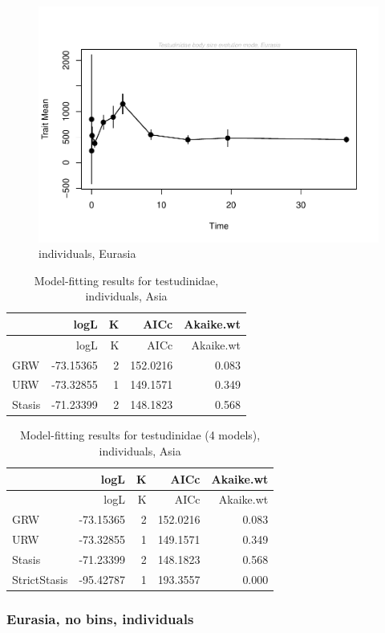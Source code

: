 \documentclass[]{article}
\begin{document}
\begin{figure}[htbp]
\centering
\includegraphics{MA_JJ_files/figure-latex/paleoTS, individuals, Eurasia-1.pdf}
\caption{individuals, Eurasia}
\end{figure}

\begin{longtable}[]{@{}lrrrr@{}}
\caption{Model-fitting results for testudinidae, individuals,
Asia}\tabularnewline
\toprule
& logL & K & AICc & Akaike.wt\tabularnewline
\midrule
\endfirsthead
\toprule
& logL & K & AICc & Akaike.wt\tabularnewline
\midrule
\endhead
GRW & -73.15365 & 2 & 152.0216 & 0.083\tabularnewline
URW & -73.32855 & 1 & 149.1571 & 0.349\tabularnewline
Stasis & -71.23399 & 2 & 148.1823 & 0.568\tabularnewline
\bottomrule
\end{longtable}

\begin{longtable}[]{@{}lrrrr@{}}
\caption{Model-fitting results for testudinidae (4 models), individuals,
Asia}\tabularnewline
\toprule
& logL & K & AICc & Akaike.wt\tabularnewline
\midrule
\endfirsthead
\toprule
& logL & K & AICc & Akaike.wt\tabularnewline
\midrule
\endhead
GRW & -73.15365 & 2 & 152.0216 & 0.083\tabularnewline
URW & -73.32855 & 1 & 149.1571 & 0.349\tabularnewline
Stasis & -71.23399 & 2 & 148.1823 & 0.568\tabularnewline
StrictStasis & -95.42787 & 1 & 193.3557 & 0.000\tabularnewline
\bottomrule
\end{longtable}

\newpage

\subsubsection{Eurasia, no bins,
individuals}\label{eurasia-no-bins-individuals}
\end{document}
